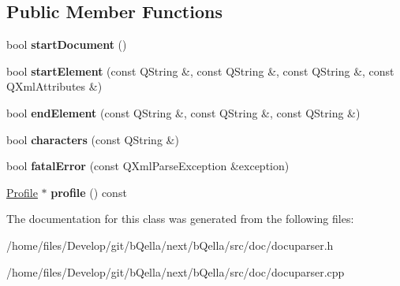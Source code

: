 \subsection*{Public Member Functions}
\begin{DoxyCompactItemize}
\item 
\hypertarget{classDocuParserRAP_acdcbe6b3d092878a2cbd726d4d846af4}{
bool {\bfseries startDocument} ()}
\label{classDocuParserRAP_acdcbe6b3d092878a2cbd726d4d846af4}

\item 
\hypertarget{classDocuParserRAP_a345225727306ca2fd27dcfb9c5002fd5}{
bool {\bfseries startElement} (const QString \&, const QString \&, const QString \&, const QXmlAttributes \&)}
\label{classDocuParserRAP_a345225727306ca2fd27dcfb9c5002fd5}

\item 
\hypertarget{classDocuParserRAP_accd93cd7103e8374aa5a585595cb3129}{
bool {\bfseries endElement} (const QString \&, const QString \&, const QString \&)}
\label{classDocuParserRAP_accd93cd7103e8374aa5a585595cb3129}

\item 
\hypertarget{classDocuParserRAP_a149e03d0c48eb50a62582a7ab0d89e86}{
bool {\bfseries characters} (const QString \&)}
\label{classDocuParserRAP_a149e03d0c48eb50a62582a7ab0d89e86}

\item 
\hypertarget{classDocuParserRAP_a965c748473820d302b6d4743cc5263b0}{
bool {\bfseries fatalError} (const QXmlParseException \&exception)}
\label{classDocuParserRAP_a965c748473820d302b6d4743cc5263b0}

\item 
\hypertarget{classDocuParserRAP_a4d1c125084949289b3dc7d3d5faf3d8e}{
\hyperlink{classProfile}{Profile} $\ast$ {\bfseries profile} () const }
\label{classDocuParserRAP_a4d1c125084949289b3dc7d3d5faf3d8e}

\end{DoxyCompactItemize}


The documentation for this class was generated from the following files:\begin{DoxyCompactItemize}
\item 
/home/files/Develop/git/bQella/next/bQella/src/doc/docuparser.h\item 
/home/files/Develop/git/bQella/next/bQella/src/doc/docuparser.cpp\end{DoxyCompactItemize}
